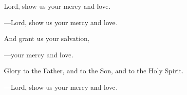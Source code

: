 \responsory

\begin{hangpar}
Lord, show us your mercy and love.

{\color{red}---\thinspace }Lord, show us your mercy and love.

\medskip And grant us your salvation,

{\color{red}---\thinspace }your mercy and love.

\medskip Glory to the Father, and to the Son, and to the Holy Spirit.

{\color{red}---\thinspace }Lord, show us your mercy and love.
\end{hangpar}